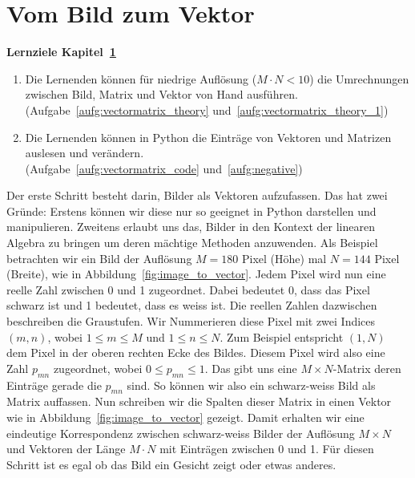 \section{Vom Bild zum Vektor} \label{sec:vectormatrix}
\begin{tcolorbox}
	\centerline{\textbf{Lernziele Kapitel~\ref{sec:vectormatrix}}}
	\begin{enumerate}[leftmargin=*,label=\thesection.\arabic*]
		\item \label{item:vectormatrix_theory} Die Lernenden können für niedrige Auflösung ($M\cdot N<10$) die Umrechnungen zwischen Bild, Matrix und Vektor von Hand ausführen.\\
		(Aufgabe~\ref{aufg:vectormatrix_theory} und~\ref{aufg:vectormatrix_theory_1})
		\item \label{item:vectormatrix_code} Die Lernenden können in Python die Einträge von Vektoren und Matrizen auslesen und verändern.\\
		(Aufgabe~\ref{aufg:vectormatrix_code} und~\ref{aufg:negative})
	\end{enumerate}
\end{tcolorbox}
Der erste Schritt besteht darin, Bilder als Vektoren aufzufassen.
Das hat zwei Gründe: Erstens können wir diese nur so geeignet in Python darstellen und manipulieren.
Zweitens erlaubt uns das, Bilder in den Kontext der linearen Algebra zu bringen um deren mächtige Methoden anzuwenden.
Als Beispiel betrachten wir ein Bild der Auflösung $M=180$ Pixel (Höhe) mal $N=144$ Pixel (Breite), wie in Abbildung~\ref{fig:image_to_vector}.
Jedem Pixel wird nun eine reelle Zahl zwischen 0 und 1 zugeordnet.
Dabei bedeutet 0, dass das Pixel schwarz ist und 1 bedeutet, dass es weiss ist.
Die reellen Zahlen dazwischen beschreiben die Graustufen.
Wir Nummerieren diese Pixel mit zwei Indices $\left(m,n\right)$, wobei $1\leq m\leq M$ und $1\leq n\leq N$.
Zum Beispiel entspricht $\left(1,N\right)$ dem Pixel in der oberen rechten Ecke des Bildes.
Diesem Pixel wird also eine Zahl $p_{mn}$ zugeordnet, wobei $0\leq p_{mn}\leq 1$.
Das gibt uns eine $M\times N$-Matrix deren Einträge gerade die $p_{mn}$ sind.
So können wir also ein schwarz-weiss Bild als Matrix auffassen.
Nun schreiben wir die Spalten dieser Matrix in einen Vektor wie in Abbildung~\ref{fig:image_to_vector} gezeigt.
Damit erhalten wir eine eindeutige Korrespondenz zwischen schwarz-weiss Bilder der Auflösung $M\times N$ und Vektoren der Länge $M\cdot N$ mit Einträgen zwischen 0 und 1.
Für diesen Schritt ist es egal ob das Bild ein Gesicht zeigt oder etwas anderes.
